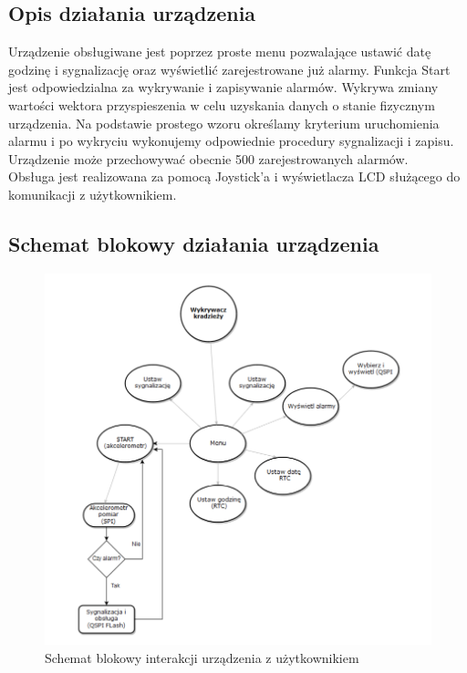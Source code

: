 \documentclass[10pt, a4paper]{article}
\begin{document}
\subsection{Opis działania urządzenia}

Urządzenie obsługiwane jest poprzez proste menu pozwalające ustawić datę godzinę i sygnalizację oraz wyświetlić zarejestrowane już alarmy. Funkcja Start jest odpowiedzialna za wykrywanie i zapisywanie alarmów.
Wykrywa zmiany wartości wektora przyspieszenia w celu uzyskania danych o stanie fizycznym urządzenia. Na podstawie prostego wzoru określamy kryterium uruchomienia alarmu i po wykryciu wykonujemy odpowiednie procedury sygnalizacji i zapisu.
Urządzenie może przechowywać obecnie 500 zarejestrowanych alarmów. \\

Obsługa jest realizowana za pomocą Joystick'a i wyświetlacza LCD służącego do komunikacji z użytkownikiem.
\subsection{Schemat blokowy działania urządzenia}
\begin{figure}[H]
\centering
\includegraphics[width=13cm]{figures/d.png}
\caption{Schemat blokowy interakcji urządzenia z użytkownikiem}
\end{figure}
\end{document}
